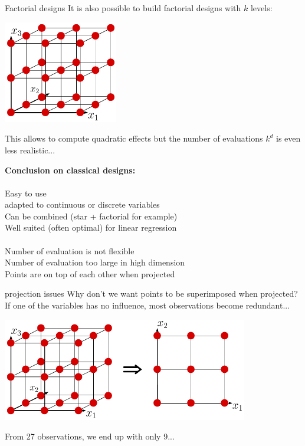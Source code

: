 \begin{frame}{Factorial designs}
It is also possible to build factorial designs with $k$ levels:
\begin{center}
\includegraphics[width=5cm]{2_Design_of_experiments/figures/latexdraw/factorial3levels}
\end{center}
This allows to compute quadratic effects but the number of evaluations $k^d$ is even less realistic...
\end{frame}

\begin{frame}{}
\textbf{Conclusion on classical designs:}\\
\\
\quad Easy to use\\
\quad adapted to continuous or discrete variables\\
\quad Can be combined (star + factorial for example)\\
\quad Well suited (often optimal) for linear regression\\
\vspace{5mm}
\\
\quad Number of evaluation is not flexible\\
\quad Number of evaluation too large in high dimension\\
\quad Points are on top of each other when projected
\end{frame}

\begin{frame}{projection issues}
Why don't we want points to be superimposed when projected?\\
If one of the variables has no influence, most observations become redundant...
\begin{center}
\includegraphics[height=4.5cm]{2_Design_of_experiments/figures/latexdraw/factorialprojection}
\end{center}
From 27 observations, we end up with only 9...
\end{frame}

